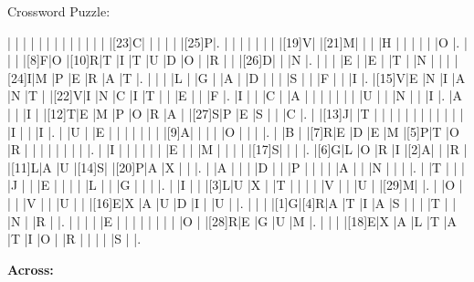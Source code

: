 \documentclass[12pt]{article}
\begin{document}
\begin{center}
  \huge{Crossword Puzzle:}
\end{center}
\vspace{1.5cm}
\begin{Puzzle}{21}{21}
  |{}  |{}  |{}  |{}  |{}  |{}  |{}  |{}  |{}  |{}  |{}  |{}  |{}  |[23]C|{}  |{}  |{}  |{}  |{}  |[25]P|.
  |{}  |{}  |{}  |{}  |{}  |{}  |{}  |[19]V|{}  |[21]M|{}  |{}  |{}  |H   |{}  |{}  |{}  |{}  |{}  |O   |.
  |{}  |{}  |{}  |[8]F|O   |[10]R|T   |I   |T   |U   |D   |O   |{}  |R   |{}  |{}  |[26]D|{}  |{}  |N   |.
  |{}  |{}  |{}  |E   |{}  |E   |{}  |T   |{}  |N   |{}  |{}  |{}  |[24]I|M   |P   |E   |R   |A   |T   |.
  |{}  |{}  |{}  |L   |{}  |G   |{}  |A   |{}  |D   |{}  |{}  |{}  |S   |{}  |{}  |F   |{}  |{}  |I   |.
  |[15]V|E   |N   |I   |A   |N   |T   |{}  |[22]V|I   |N   |C   |I   |T   |{}  |{}  |E   |{}  |{}  |F   |.
  |I   |{}  |{}  |C   |{}  |A   |{}  |{}  |{}  |{}  |{}  |{}  |{}  |U   |{}  |{}  |N   |{}  |{}  |I   |.
  |A   |{}  |{}  |I   |{}  |[12]T|E   |M   |P   |O   |R   |A   |{}  |[27]S|P   |E   |S   |{}  |{}  |C   |.
  |{}  |[13]J|{}  |T   |{}  |{}  |{}  |{}  |{}  |{}  |{}  |{}  |{}  |{}  |{}  |{}  |I   |{}  |{}  |I   |.
  |{}  |U   |{}  |E   |{}  |{}  |{}  |{}  |{}  |{}  |{}  |[9]A|{}  |{}  |{}  |{}  |O   |{}  |{}  |{}  |.
  |{}  |B   |{}  |[7]R|E   |D   |E   |M   |[5]P|T   |O   |R   |{}  |{}  |{}  |{}  |{}  |{}  |{}  |{}  |.
  |{}  |I   |{}  |{}  |{}  |{}  |{}  |{}  |E   |{}  |{}  |M   |{}  |{}  |{}  |{}  |[17]S|{}  |{}  |{}  |.
  |[6]G|L   |O   |R   |I   |[2]A|{}  |{}  |R   |{}  |[11]L|A   |U   |[14]S|{}  |[20]P|A   |X   |{}  |{}  |.
  |{}  |A   |{}  |{}  |{}  |D   |{}  |{}  |P   |{}  |{}  |{}  |{}  |A   |{}  |{}  |N   |{}  |{}  |{}  |.
  |{}  |T   |{}  |{}  |{}  |J   |{}  |{}  |E   |{}  |{}  |{}  |{}  |L   |{}  |{}  |G   |{}  |{}  |{}  |.
  |{}  |I   |{}  |{}  |[3]L|U   |X   |{}  |T   |{}  |{}  |{}  |{}  |V   |{}  |{}  |U   |{}  |[29]M|{}  |.
  |{}  |O   |{}  |{}  |{}  |V   |{}  |{}  |U   |{}  |{}  |[16]E|X   |A   |U   |D   |I   |{}  |U   |{}  |.
  |{}  |{}  |{}  |[1]G|[4]R|A   |T   |I   |A   |S   |{}  |{}  |{}  |T   |{}  |{}  |N   |{}  |R   |{}  |.
  |{}  |{}  |{}  |{}  |E   |{}  |{}  |{}  |{}  |{}  |{}  |{}  |{}  |O   |{}  |[28]R|E   |G   |U   |M   |.
  |{}  |{}  |{}  |[18]E|X   |A   |L   |T   |A   |T   |I   |O   |{}  |R   |{}  |{}  |{}  |{}  |S   |{}  |.
\end{Puzzle}
\begin{PuzzleClues}{\textbf{Across:}}
\end{PuzzleClues}
\end{document}
